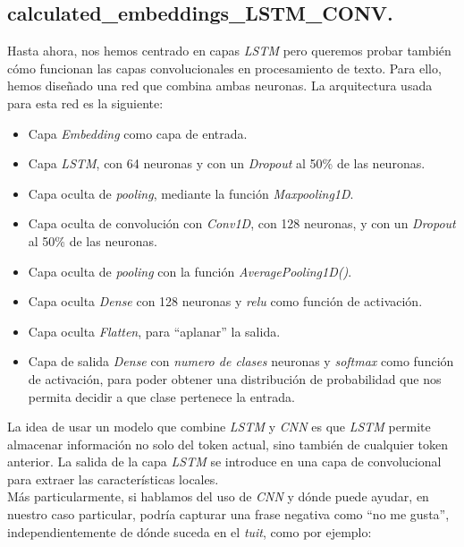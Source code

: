 \documentclass[11pt]{article}
\begin{document}


\subsection{calculated\_embeddings\_LSTM\_CONV.} \label{calculatedembeddingsLSTMCONV}

Hasta ahora, nos hemos centrado en capas \textit{LSTM} pero queremos probar también cómo funcionan las capas convolucionales en procesamiento de texto. Para ello, hemos diseñado una red que combina ambas neuronas. La arquitectura usada para esta red es la siguiente:

\begin{itemize}
    \item Capa \textit{Embedding} como capa de entrada.
    \item Capa \textit{LSTM}, con 64 neuronas y con un \textit{Dropout} al 50\% de las neuronas.
    \item Capa oculta de \textit{pooling}, mediante la función \textit{Maxpooling1D}.
    \item Capa oculta de convolución con \textit{Conv1D}, con 128 neuronas,  y con un \textit{Dropout} al 50\% de las neuronas.
    \item Capa oculta de \textit{pooling} con la función \textit{AveragePooling1D()}.
    \item Capa oculta \textit{Dense} con 128 neuronas y \textit{relu} como función de activación.
    \item Capa oculta \textit{Flatten}, para ``aplanar'' la salida.
    \item Capa de salida \textit{Dense} con \textit{numero de clases} neuronas y \textit{softmax} como función de activación, para poder obtener una distribución de probabilidad que nos permita decidir a que clase pertenece la entrada.
\end{itemize}

La idea de usar un modelo que combine \textit{LSTM} y \textit{CNN} es que \textit{LSTM} permite almacenar información no solo del token actual, sino también de cualquier token anterior. La salida de la capa \textit{LSTM} se introduce en una capa de convolucional para extraer las características locales. \\

Más particularmente, si hablamos del uso de \textit{CNN} y dónde puede ayudar, en nuestro caso particular, podría capturar una frase negativa como ``no me gusta'', independientemente de dónde suceda en el \textit{tuit}, como por ejemplo:
\end{document}
